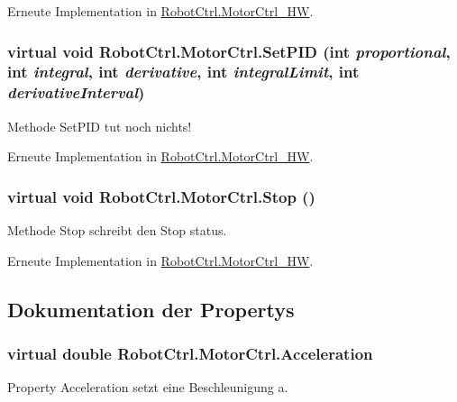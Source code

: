 Erneute Implementation in \hyperlink{class_robot_ctrl_1_1_motor_ctrl___h_w_a1a116e83d87c50119567ff4ae334b239}{RobotCtrl.MotorCtrl\_\-HW}.

\hypertarget{class_robot_ctrl_1_1_motor_ctrl_ac6e7ec6b155d337dddf2fe1bc660c11b}{
\subsubsection[{SetPID}]{\setlength{\rightskip}{0pt plus 5cm}virtual void RobotCtrl.MotorCtrl.SetPID (int {\em proportional}, \/  int {\em integral}, \/  int {\em derivative}, \/  int {\em integralLimit}, \/  int {\em derivativeInterval})}}
\label{class_robot_ctrl_1_1_motor_ctrl_ac6e7ec6b155d337dddf2fe1bc660c11b}
Methode SetPID tut noch nichts! 

Erneute Implementation in \hyperlink{class_robot_ctrl_1_1_motor_ctrl___h_w_a24f22cd266cce1e701f9823e02816ff5}{RobotCtrl.MotorCtrl\_\-HW}.

\hypertarget{class_robot_ctrl_1_1_motor_ctrl_a4e61bcac558a43dd2d1470ded5fed820}{
\subsubsection[{Stop}]{\setlength{\rightskip}{0pt plus 5cm}virtual void RobotCtrl.MotorCtrl.Stop ()}}
\label{class_robot_ctrl_1_1_motor_ctrl_a4e61bcac558a43dd2d1470ded5fed820}
Methode Stop schreibt den Stop status. 

Erneute Implementation in \hyperlink{class_robot_ctrl_1_1_motor_ctrl___h_w_ad7a992614ff75966b4381f8f8ef56cfd}{RobotCtrl.MotorCtrl\_\-HW}.



\subsection{Dokumentation der Propertys}
\hypertarget{class_robot_ctrl_1_1_motor_ctrl_a57bbec274a01f59d5e5ede7599e0ca9f}{
\subsubsection[{Acceleration}]{\setlength{\rightskip}{0pt plus 5cm}virtual double RobotCtrl.MotorCtrl.Acceleration}}
\label{class_robot_ctrl_1_1_motor_ctrl_a57bbec274a01f59d5e5ede7599e0ca9f}
Property Acceleration setzt eine Beschleunigung a. 

